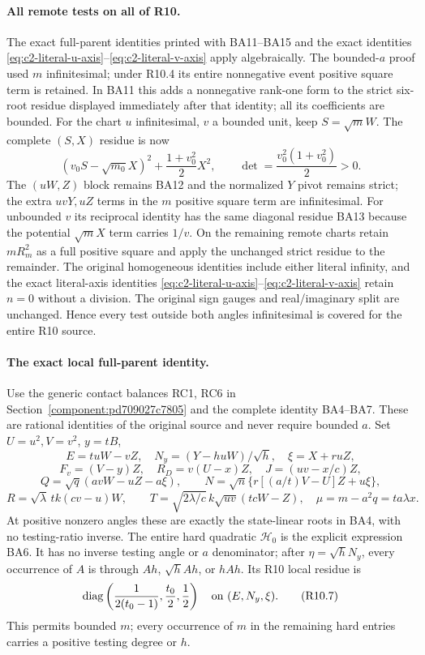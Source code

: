 \paragraph{All remote tests on all of R10.}
The exact full-parent identities printed with BA11--BA15 and the exact identities \eqref{eq:c2-literal-u-axis}--\eqref{eq:c2-literal-v-axis} apply algebraically. The
bounded-$a$ proof used $m$ infinitesimal; under R10.4 its entire
nonnegative event positive square term is retained. In BA11 this adds a nonnegative
rank-one form to the strict six-root residue displayed immediately
after that identity; all its coefficients are bounded. For the chart
$u$ infinitesimal, $v$ a bounded unit, keep $S=\sqrt m W$.
The complete $(S,X)$ residue is now
\[
 (v_0S-\sqrt{m_0}X)^2+\frac{1+v_0^2}{2}X^2,
 \qquad \det=\frac{v_0^2(1+v_0^2)}2>0.
\tag{R10.6}
\]
The $(uW,Z)$ block remains BA12 and the normalized $Y$ pivot remains
strict; the extra $uvY,uZ$ terms in the $m$ positive square term are infinitesimal.
For unbounded $v$ its reciprocal identity has the same diagonal
residue BA13 because the potential $\sqrt m X$ term carries $1/v$.
On the remaining remote charts retain $mR_m^2$ as a full positive
square and apply the unchanged strict residue to the remainder.
The original homogeneous identities include either literal infinity,
and the exact literal-axis identities \eqref{eq:c2-literal-u-axis}--\eqref{eq:c2-literal-v-axis} retain $n=0$ without a division. The original
sign gauges and real/imaginary split are unchanged. Hence every test
outside both angles infinitesimal is covered for the entire R10 source.

\paragraph{The exact local full-parent identity.}
Use the generic contact balances RC1, RC6 in
Section~\ref{component:pd709027c7805} and the complete identity
BA4--BA7. These are rational identities of the original source and
never require bounded $a$. Set $U=u^2,V=v^2$, $y=tB$,
\[
 E=tuW-vZ,\quad N_y=(Y-huW)/\sqrt h,\quad \xi=X+ruZ,
\]
\[
 F_v=(V-y)Z,\quad R_D=v(U-x)Z,\quad J=(uv-x/c)Z,
\]
\[
 Q=\sqrt q(avW-uZ-a\xi),\qquad
 N=\sqrt n\{r[(a/t)V-U]Z+u\xi\},
\]
\[
 R=\sqrt\lambda\,tk(cv-u)W,\qquad
 T=\sqrt{2\lambda/c}\,k\sqrt{uv}(tcW-Z),\quad
 \mu=m-a^2q=ta\lambda x.
\]
At positive nonzero angles these are exactly the state-linear roots
in BA4, with no testing-ratio inverse. The entire hard quadratic
$\mathcal H_0$ is the explicit expression BA6. It has no inverse
testing angle or $a$ denominator; after $\eta=\sqrt hN_y$, every
occurrence of $A$ is through $Ah$, $\sqrt hAh$, or $hAh$.
Its R10 local residue is
\[
 \operatorname{diag}\left(\frac1{2(t_0-1)},\frac{t_0}2,\frac12\right)
 \quad\hbox{on }(E,N_y,\xi).
\tag{R10.7}
\]
This permits bounded $m$; every occurrence of $m$ in the remaining
hard entries carries a positive testing degree or $h$.

